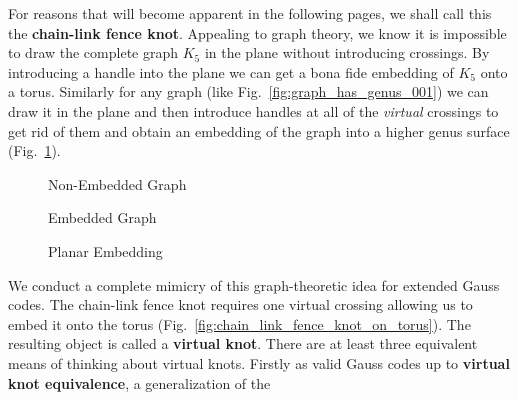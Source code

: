         For reasons that will become apparent in the following pages, we shall
        call this the \textbf{chain-link fence knot}. Appealing to graph
        theory, we know it is impossible to draw the complete graph
        $K_{5}$ in the plane without introducing crossings. By introducing a
        handle into the plane we can get a bona fide embedding of
        $K_{5}$ onto a torus. Similarly for any graph (like
        Fig.~\ref{fig:graph_has_genus_001}) we can draw it in the
        plane and then introduce handles at all of the \textit{virtual}
        crossings to get rid of them and obtain an embedding of the graph
        into a higher genus surface (Fig.~\ref{fig:graph_has_genus_002}).
        \begin{figure}
            \centering
            \begin{minipage}[b]{0.49\textwidth}
                \centering
                \caption{Non-Embedded Graph}
                \label{fig:graph_has_genus_001}
            \end{minipage}
            \hfill
            \begin{minipage}[b]{0.49\textwidth}
                \centering
                \caption{Embedded Graph}
                \label{fig:graph_has_genus_002}
            \end{minipage}
        \end{figure}
        \begin{figure}
            \centering
            \caption{Planar Embedding}
            \label{fig:graph_has_genus_003}
        \end{figure}
        \par\hfill\par
        We conduct a complete mimicry of this graph-theoretic idea for
        extended Gauss codes. The chain-link fence knot requires one
        virtual crossing allowing us to embed it onto the torus
        (Fig.~\ref{fig:chain_link_fence_knot_on_torus}). The resulting object
        is called a \textbf{virtual knot}. There are at least three equivalent
        means of thinking about virtual knots. Firstly as valid Gauss codes
        up to \textbf{virtual knot equivalence}, a generalization of the
